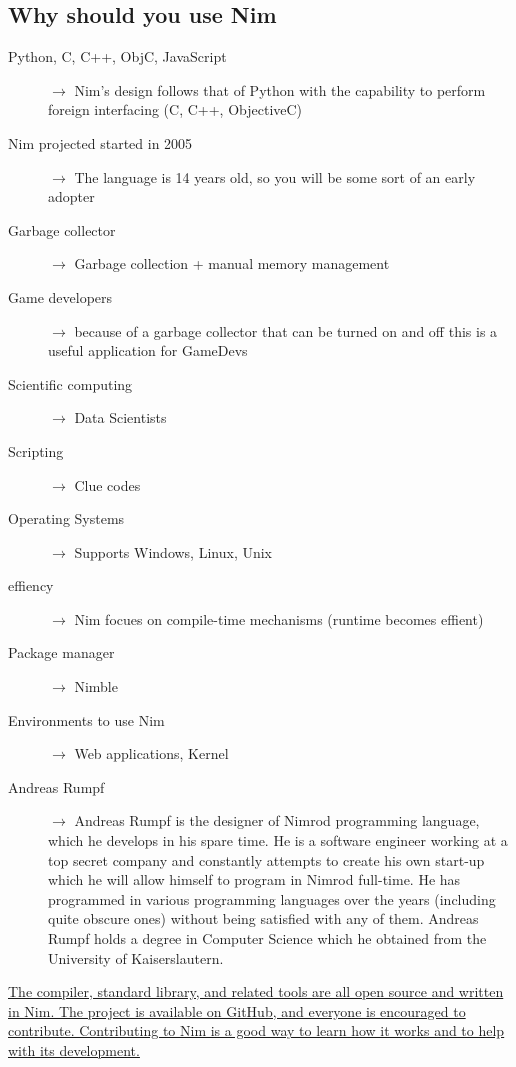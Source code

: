 \documentclass[10pt, a4paper, twocolumn]{article} %
\begin{document}
\newpage
\subsection{Why should you use Nim}
\begin{description}
	\item[Python, C, C++, ObjC, JavaScript] $\longrightarrow$ Nim's design follows that of Python with the capability to perform foreign interfacing (C, C++, ObjectiveC)
	\item[Nim projected started in 2005] $\longrightarrow$  The language is 14 years old, so you will be some sort of an early adopter
	\item[Garbage collector] $\longrightarrow$  Garbage collection + manual memory management
	\item[Game developers] $\longrightarrow$  because of a garbage collector that can be turned on and off this is a useful application for GameDevs
	\item[Scientific computing] $\longrightarrow$  Data Scientists
	\item[Scripting] $\longrightarrow$  Clue codes
	\item[Operating Systems] $\longrightarrow$  Supports Windows, Linux, Unix
	\item[effiency] $\longrightarrow$  Nim focues on compile-time mechanisms (runtime becomes effient)
	\item[Package manager] $\longrightarrow$   Nimble
	\item[Environments to use Nim] $\longrightarrow$  Web applications, Kernel
	\item[Andreas Rumpf] $\longrightarrow$  Andreas Rumpf is the designer of Nimrod programming language, which he develops in his spare time. He is a software engineer working at a top secret company and constantly attempts to create his own start-up which he will allow himself to program in Nimrod full-time. He has programmed in various programming languages over the years (including quite obscure ones) without being satisfied with any of them. Andreas Rumpf holds a degree in Computer Science which he obtained from the University of Kaiserslautern.
\end{description}

\href{https://github.com/nim-lang/Nim#contributing}{The compiler, standard library, and related tools are all open source and written in Nim. The project is available on GitHub, and everyone is encouraged to contribute. Contributing to Nim is a good way to learn how it works and to help with its development.}
\end{document}
